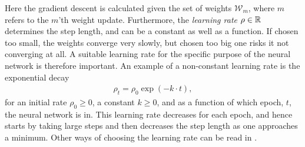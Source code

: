 Here the gradient descent is calculated given the set of weights $\mathcal{W}_m$, where $m$ refers to the $m$'th weight update. Furthermore, the \emph{learning rate} $\rho \in \mathbb{R}$ determines the step length, and can be a constant as well as a function. If chosen too small, the weights converge very slowly, but chosen too big one risks it not converging at all. A suitable learning rate for the specific purpose of the neural network is therefore important. An example of a non-constant learning rate is the exponential decay
\begin{align*}
    \rho_t = \rho_0 \exp{(-k \cdot t)},
\end{align*}
for an initial rate $\rho_0\geq0$, a constant $k \geq 0$, and as a function of which epoch, $t$, the neural network is in. This learning rate decreases for each epoch, and hence starts by taking large steps and then decreases the step length as one approaches a minimum. Other ways of choosing the learning rate can be read in \citep[p. 135-141]{NNDL}.

